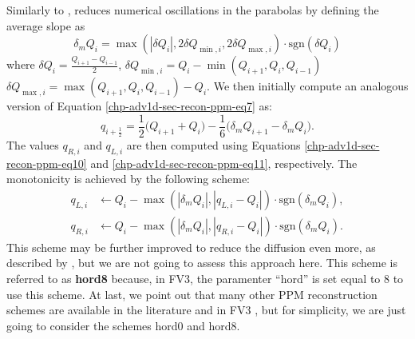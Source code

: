 Similarly to \citet{colella:1984}, \citet{lin:2004} reduces numerical oscillations
in the parabolas by defining the average slope as
\begin{equation}
	\label{chp-adv1d-sec-mono-eq4}
	\delta_m Q_{i} = 
	\max(|\delta Q_i|, 2\delta Q_{\min,i}, 2\delta Q_{\max,i}) \cdot \text{sgn}(\delta Q_i)
\end{equation}
where 
$\delta Q_i= \frac{Q_{i+1}-Q_{i-1}}{2}$,
$\delta Q_{\min,i} = Q_i - \min(Q_{i+1}, Q_i, Q_{i-1})$ 
$\delta Q_{\max,i} = \max(Q_{i+1}, Q_i, Q_{i-1}) - Q_i$.
We then initially compute an analogous version of Equation \eqref{chp-adv1d-sec-recon-ppm-eq7} as:
\begin{equation}
	q_{i+\frac{1}{2}} = 
	\frac{1}{2} \bigg( Q_{i+1} + Q_{i} \bigg) - \frac{1}{6} \bigg( \delta_m Q_{i+1} - \delta_m Q_{i}\bigg).
\end{equation}
The values $q_{R,i}$ and $q_{L,i}$ are then computed using Equations \eqref{chp-adv1d-sec-recon-ppm-eq10}
and \eqref{chp-adv1d-sec-recon-ppm-eq11}, respectively.
The monotonicity is achieved by the following scheme:
\begin{align}
	\label{chp-adv1d-sec-mono-eq5}
	q_{L,i} &\leftarrow Q_i - \max(|\delta_m Q_i|, |q_{L,i}-Q_i|) \cdot \text{sgn}(\delta_m Q_i),\\
	q_{R,i} &\leftarrow Q_i - \max(|\delta_m Q_i|, |q_{R,i}-Q_i|) \cdot \text{sgn}(\delta_m Q_i).
\end{align}
This scheme may be further improved to reduce the diffusion even more, as described by \citet{lin:2004},
but we are not going to assess this approach here.
This scheme is referred to as \textbf{hord8} because, in FV3, the paramenter ``hord'' is set equal to 8 to use this scheme.
At last, we point out that many other PPM reconstruction schemes are available in the literature and in FV3 
\citep{harris:2021,lin:2017}, but for simplicity, we are just going to consider the schemes hord0 and hord8.

